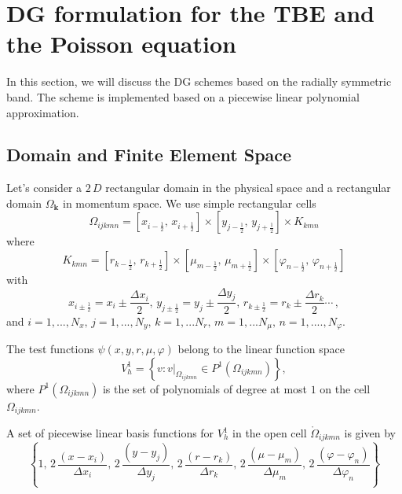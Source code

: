 \documentclass[11pt]{article}
\newcommand{\bk}{\mathbf{k}}
\newcommand{\bE}{\mathbf{E}}
\newcommand{\ot}{\frac{1}{2}}
\newcommand{\domk}{\Omega_{\bk}}
\begin{document}
%


\section{DG formulation for the TBE and the Poisson equation} 
%
%
%
In this section, we will discuss the DG schemes based on the radially symmetric band. The scheme is implemented based on a piecewise linear polynomial approximation.

\subsection{Domain and Finite Element Space}
%
Let's consider a $2 \, D$ rectangular domain in the physical space and a rectangular domain $\domk$ in momentum space.
We use simple rectangular cells
%
$$
 \Omega_{ijkmn} = \left[ x_{i - \ot} , \, x_{i + \ot} \right] \times
                  \left[ y_{j - \ot} , \, y_{j + \ot} \right] \times
K_{kmn}
$$
%
where
$$
K_{kmn} =
          \left[ r_{k - \ot} , \, r_{k + \ot} \right] \times
          \left[ \mu_{m - \ot} , \, \mu_{m + \ot} \right] \times
          \left[ \varphi_{n - \ot} , \, \varphi_{n + \ot} \right] 
$$
%
with
%
$$
 x_{i \pm \ot} = x_{i} \pm \frac{\Delta x_{i}}{2}, \,
 y_{j \pm \ot} = y_{j} \pm \frac{\Delta y_{j}}{2}, \,
 r_{k \pm \ot} = r_{k} \pm \frac{\Delta r_{k}}{2} \cdots \, ,
$$
%
and $i=1,...,N_x, \, j=1,..., N_y, \, k=1,...N_r, \, m=1,...N_{\mu}, \, n=1,....,N_\varphi$.

The test functions $\psi(x,y,r,\mu,\varphi)$ belong to the linear function space
%
$$
V_h^1 = \left\{ v : v|_{\Omega_{ijkmn}} \in P^1(\Omega_{ijkmn}) \right\} ,
$$
%
where 
$P^1(\Omega_{ijkmn})$ is the set of polynomials of degree at most $1$ on the cell $ \Omega_{ijkmn}$.

A set of piecewise linear basis functions for $V_h^1$ in the open cell $\mathring{\Omega}_{ijkmn}$ is given by
%
\begin{equation}
\left\lbrace 
1, \, 2 \, \frac{(x - x_{i})}{\Delta x_{i}} , \, 2 \, \frac{(y - y_{j})}{\Delta y_{j}} ,
\, 2 \, \frac{(r - r_{k})}{\Delta r_{k}} , \, 2 \, \frac{(\mu - \mu_{m})}{\Delta \mu_{m}} ,
\, 2 \, \frac{(\varphi - \varphi_{n})}{\Delta \varphi_{n}} 
\right\rbrace  \label{basic_func}
\end{equation}
%
\end{document}
